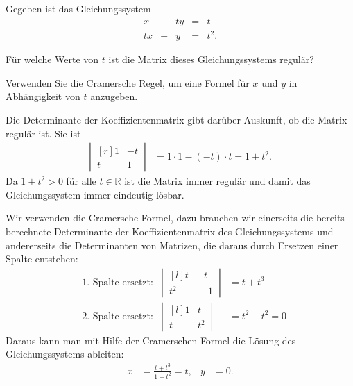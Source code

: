 Gegeben ist das Gleichungssystem
\[
\renewcommand\arraycolsep{2pt}
\begin{array}{rcrcl}
 x&-&t y&=&t\\
tx&+&  y&=&t^2.
\end{array}
\]
\begin{teilaufgaben}
\item Für welche Werte von $t$ ist die Matrix dieses Gleichungssystems
regulär?
\item
Verwenden Sie die Cramersche Regel, um 
eine Formel für $x$ und $y$ in Abhängigkeit von $t$ anzugeben.
\end{teilaufgaben}


\begin{loesung}
\begin{teilaufgaben}
\item
Die Determinante der Koeffizientenmatrix gibt darüber Auskunft, ob die
Matrix regulär ist. Sie ist
\begin{align*}
\left|\,\begin{matrix*}[r]1&-t\\t&1\end{matrix*}\,\right|
&=1\cdot 1-(-t)\cdot t=1+t^2.
\end{align*}
Da $1+t^2>0$ für alle $t\in\mathbb R$ ist die Matrix immer regulär und
damit das Gleichungssystem immer eindeutig lösbar.
\item
Wir verwenden die Cramersche Formel, dazu brauchen wir einerseits die bereits
berechnete Determinante der Koeffizientenmatrix des Gleichungssystems
und andererseits die Determinanten von Matrizen, die daraus durch Ersetzen
einer Spalte entstehen:
\begin{align*}
&\text{1.~Spalte ersetzt:}&
\left|\,\begin{matrix*}[l]t&-t\\t^2&\phantom{-}1\end{matrix*}\,\right|
&=t+t^3
\\
&\text{2.~Spalte ersetzt:}&
\left|\,\begin{matrix*}[l]1&t\\t&t^2\end{matrix*}\,\right|
&=t^2-t^2=0
\end{align*}
Daraus kann man mit Hilfe der Cramerschen Formel die Lösung des
Gleichungssystems ableiten:
\begin{align*}
x&=\frac{t+t^3}{1+t^2}=t,&
y&=0.
\end{align*}
\qedhere
\end{teilaufgaben}
\end{loesung}
